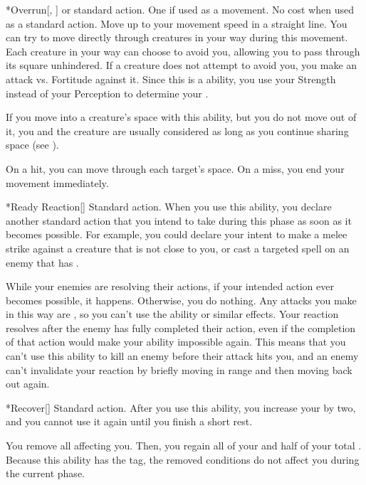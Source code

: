     \begin{activeability}*{Overrun}[, ]
      \abilityusagetime {} or standard action.
      \abilitycost One  if used as a movement. No cost when used as a standard action.
      \rankline
      Move up to your movement speed in a straight line.
      You can try to move directly through creatures in your way during this movement.
      Each creature in your way can choose to avoid you, allowing you to pass through its square unhindered.
      If a creature does not attempt to avoid you, you make an attack vs. Fortitude against it.
      Since this is a  ability, you use your Strength instead of your Perception to determine your .

      If you move into a creature's space with this ability, but you do not move out of it, you and the creature are usually considered \squeezing as long as you continue sharing space (see ).

      On a hit, you can move through each target's space.
      On a miss, you end your movement immediately.
    \end{activeability}

    \begin{activeability}*{Ready Reaction}[\atSwift]
      \abilityusagetime Standard action.
      \rankline
      When you use this ability, you declare another standard action that you intend to take during this phase as soon as it becomes possible.
      For example, you could declare your intent to make a melee strike against a creature that is not close to you, or cast a targeted spell on an enemy that has .

      While your enemies are resolving their actions, if your intended action ever becomes possible, it happens.
      Otherwise, you do nothing.
      Any attacks you make in this way are , so you can't use the  ability or similar effects.
      Your reaction resolves after the enemy has fully completed their action, even if the completion of that action would make your ability impossible again.
      This means that you can't use this ability to kill an enemy before their attack hits you, and an enemy can't invalidate your reaction by briefly moving in range and then moving back out again.
    \end{activeability}

    \begin{activeability}*{Recover}[]
      \abilityusagetime Standard action.
      \rankline
      After you use this ability, you increase your  by two, and you cannot use it again until you finish a short rest.

      You remove all  affecting you.
      Then, you regain all of your  and half of your total .
      Because this ability has the  tag, the removed conditions do not affect you during the current phase.
    \end{activeability}

